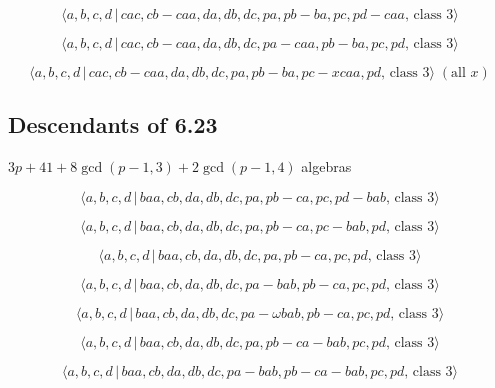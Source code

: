 \documentclass[10pt]{article}
\begin{document}
\begin{equation}
\langle a,b,c,d\,|\,cac,cb-caa,da,db,dc,pa,pb-ba,pc,pd-caa,\,\text{class }%
3\rangle  \tag{7.3911}
\end{equation}

\begin{equation}
\langle a,b,c,d\,|\,cac,cb-caa,da,db,dc,pa-caa,pb-ba,pc,pd,\,\text{class }%
3\rangle  \tag{7.3912}
\end{equation}

\begin{equation}
\langle a,b,c,d\,|\,cac,cb-caa,da,db,dc,pa,pb-ba,pc-xcaa,pd,\,\text{class }%
3\rangle \;(\text{all }x)  \tag{7.3913}
\end{equation}

\subsection{Descendants of 6.23}

$3p+41+8\gcd (p-1,3)+2\gcd (p-1,4)$ algebras

\begin{equation}
\langle a,b,c,d\,|\,baa,cb,da,db,dc,pa,pb-ca,pc,pd-bab,\,\text{class }%
3\rangle  \tag{7.3914}
\end{equation}

\begin{equation}
\langle a,b,c,d\,|\,baa,cb,da,db,dc,pa,pb-ca,pc-bab,pd,\,\text{class }%
3\rangle  \tag{7.3915}
\end{equation}

\begin{equation}
\langle a,b,c,d\,|\,baa,cb,da,db,dc,pa,pb-ca,pc,pd,\,\text{class }3\rangle 
\tag{7.3916}
\end{equation}

\begin{equation}
\langle a,b,c,d\,|\,baa,cb,da,db,dc,pa-bab,pb-ca,pc,pd,\,\text{class }%
3\rangle  \tag{7.3917}
\end{equation}

\begin{equation}
\langle a,b,c,d\,|\,baa,cb,da,db,dc,pa-\omega bab,pb-ca,pc,pd,\,\text{class }%
3\rangle  \tag{7.3918}
\end{equation}

\begin{equation}
\langle a,b,c,d\,|\,baa,cb,da,db,dc,pa,pb-ca-bab,pc,pd,\,\text{class }%
3\rangle  \tag{7.3919}
\end{equation}

\begin{equation}
\langle a,b,c,d\,|\,baa,cb,da,db,dc,pa-bab,pb-ca-bab,pc,pd,\,\text{class }%
3\rangle  \tag{7.3920}
\end{equation}
\end{document}
